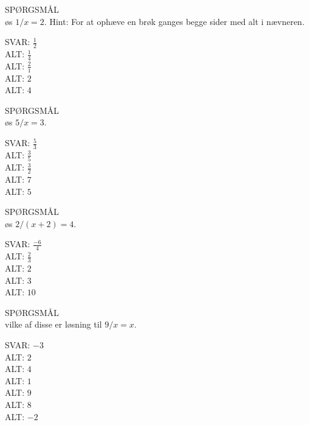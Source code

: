 \documentclass[]{article}
\newenvironment{question}[2]{SPØRGSMÅL\\}{\hspace{50px}}
\newcommand{\answer}[1]{{\color{green} SVAR: #1}\\}
\newcommand{\alt}[1]{{\color{red} ALT: #1}\\}
\begin{document}
\begin{question}{multi}
    
    Løs $1/x=2$. Hint: For at ophæve en brøk ganges begge sider med alt i nævneren.
    
    \answer{$\frac{1}{2}$}
    \alt{$\frac{1}{4}$}
    \alt{$\frac{2}{1}$}
    \alt{$2$}
    \alt{$4$}
    
\end{question}

\begin{question}{multi}
    
    Løs $5/x=3$.
    
    \answer{$\frac{5}{3}$}
    \alt{$\frac{3}{5}$}
    \alt{$\frac{3}{2}$}
    \alt{$7$}
    \alt{$5$}
    
\end{question}

\begin{question}{multi}
    
    Løs $2/(x+2)=4$.
    
    \answer{$\frac{-6}{4}$}
    \alt{$\frac{2}{3}$}
    \alt{$2$}
    \alt{$3$}
    \alt{$10$}
    
\end{question}

\begin{question}{multi}
    
    Hvilke af disse er løsning til $9/x=x$.
    
    \answer{$-3$}
    \alt{$2$}
    \alt{$4$}
    \alt{$1$}
    \alt{$9$}
    \alt{$8$}
    \alt{$-2$}
    
\end{question}
\end{document}
